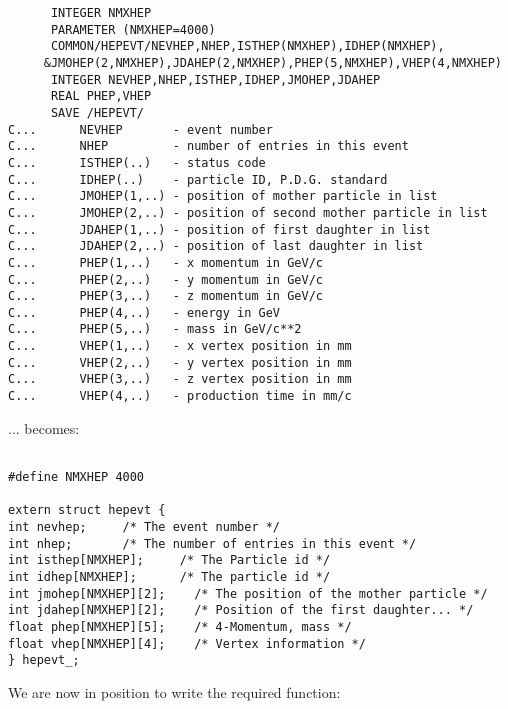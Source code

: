 \begin{verbatim}
      INTEGER NMXHEP
      PARAMETER (NMXHEP=4000)
      COMMON/HEPEVT/NEVHEP,NHEP,ISTHEP(NMXHEP),IDHEP(NMXHEP),
     &JMOHEP(2,NMXHEP),JDAHEP(2,NMXHEP),PHEP(5,NMXHEP),VHEP(4,NMXHEP)
      INTEGER NEVHEP,NHEP,ISTHEP,IDHEP,JMOHEP,JDAHEP
      REAL PHEP,VHEP
      SAVE /HEPEVT/
C...      NEVHEP       - event number
C...      NHEP         - number of entries in this event
C...      ISTHEP(..)   - status code
C...      IDHEP(..)    - particle ID, P.D.G. standard
C...      JMOHEP(1,..) - position of mother particle in list
C...      JMOHEP(2,..) - position of second mother particle in list
C...      JDAHEP(1,..) - position of first daughter in list
C...      JDAHEP(2,..) - position of last daughter in list
C...      PHEP(1,..)   - x momentum in GeV/c
C...      PHEP(2,..)   - y momentum in GeV/c
C...      PHEP(3,..)   - z momentum in GeV/c
C...      PHEP(4,..)   - energy in GeV
C...      PHEP(5,..)   - mass in GeV/c**2
C...      VHEP(1,..)   - x vertex position in mm
C...      VHEP(2,..)   - y vertex position in mm
C...      VHEP(3,..)   - z vertex position in mm
C...      VHEP(4,..)   - production time in mm/c
\end{verbatim}

... becomes: 

\begin{verbatim}

#define NMXHEP 4000

extern struct hepevt {
int nevhep;		/* The event number */
int nhep;		/* The number of entries in this event */
int isthep[NMXHEP]; 	/* The Particle id */
int idhep[NMXHEP];      /* The particle id */
int jmohep[NMXHEP][2];    /* The position of the mother particle */
int jdahep[NMXHEP][2];    /* Position of the first daughter... */
float phep[NMXHEP][5];    /* 4-Momentum, mass */
float vhep[NMXHEP][4];    /* Vertex information */
} hepevt_;
\end{verbatim}

We are now in position to write the required function:
	
